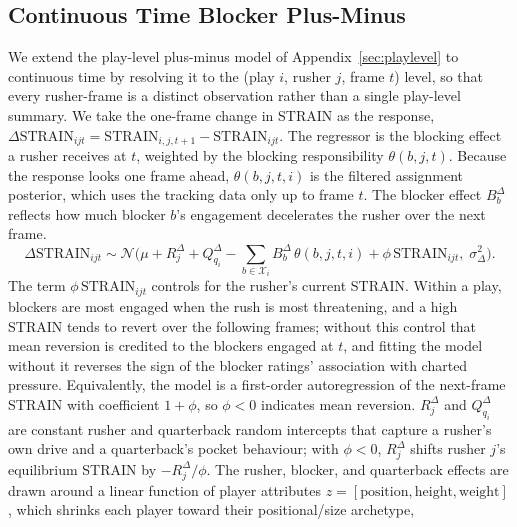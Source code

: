 \documentclass[USenglish]{article}
\let\OldSubsection\subsection
\renewcommand{\subsection}{\FloatBarrier\OldSubsection}
\theoremstyle{dgthm}
\theoremstyle{dgdef}
\begin{document}



\subsection{Continuous Time Blocker Plus-Minus }\label{continuous}

We extend the play-level plus-minus model of Appendix~\ref{sec:playlevel} to continuous time by resolving it to the (play $i$, rusher $j$, frame $t$) level, so that every rusher-frame is a distinct observation rather than a single play-level summary. We take the one-frame change in STRAIN as the response, $\Delta\text{STRAIN}_{ijt} = \text{STRAIN}_{i,j,t+1} - \text{STRAIN}_{ijt}$. The regressor is the blocking effect a rusher receives at $t$, weighted by the blocking responsibility $\theta(b,j,t)$. Because the response looks one frame ahead, $\theta(b,j,t,i)$ is the filtered assignment posterior, which uses the tracking data only up to frame $t$. The blocker effect $B^{\Delta}_b$ reflects how much blocker $b$'s engagement decelerates the rusher over the next frame.
$$ \Delta\text{STRAIN}_{ijt} \sim \mathcal{N}\Big( \mu + R^{\Delta}_{j} + Q^{\Delta}_{q_i} - \!\!\sum_{b \in \mathcal{X}_i}\!\! B^{\Delta}_{b}\,\theta(b, j, t, i) + \phi\,\text{STRAIN}_{ijt},\; \sigma_{\Delta}^2 \Big). $$
The term $\phi\,\text{STRAIN}_{ijt}$ controls for the rusher's current STRAIN. Within a play, blockers are most engaged when the rush is most threatening, and a high STRAIN tends to revert over the following frames; without this control that mean reversion is credited to the blockers engaged at $t$, and fitting the model without it reverses the sign of the blocker ratings' association with charted pressure. Equivalently, the model is a first-order autoregression of the next-frame STRAIN with coefficient $1+\phi$, so $\phi<0$ indicates mean reversion. $R^{\Delta}_j$ and $Q^{\Delta}_{q_i}$ are constant rusher and quarterback random intercepts that capture a rusher's own drive and a quarterback's pocket behaviour; with $\phi<0$, $R^{\Delta}_j$ shifts rusher $j$'s equilibrium STRAIN by $-R^{\Delta}_j/\phi$. The rusher, blocker, and quarterback effects are drawn around a linear function of player attributes $z = [\text{position}, \text{height}, \text{weight}]$, which shrinks each player toward their positional/size archetype,
\end{document}
